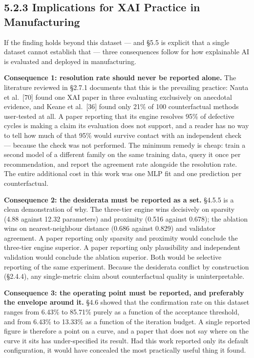\hypertarget{implications-for-xai-practice-in-manufacturing}{%
\subsection{5.2.3 Implications for XAI Practice in Manufacturing}\label{implications-for-xai-practice-in-manufacturing}}

If the finding holds beyond this dataset --- and §5.5 is explicit that a single dataset cannot establish that --- three consequences follow for how explainable AI is evaluated and deployed in manufacturing.

\textbf{Consequence 1: resolution rate should never be reported alone.} The literature reviewed in §2.7.1 documents that this is the prevailing practice: Nauta et al.~{[}70{]} found one XAI paper in three evaluating exclusively on anecdotal evidence, and Keane et al.~{[}36{]} found only 21\% of 100 counterfactual methods user-tested at all. A paper reporting that its engine resolves 95\% of defective cycles is making a claim its evaluation does not support, and a reader has no way to tell how much of that 95\% would survive contact with an independent check --- because the check was not performed. The minimum remedy is cheap: train a second model of a different family on the same training data, query it once per recommendation, and report the agreement rate alongside the resolution rate. The entire additional cost in this work was one MLP fit and one prediction per counterfactual.

\textbf{Consequence 2: the desiderata must be reported as a set.} §4.5.5 is a clean demonstration of why. The three-tier engine wins decisively on sparsity (4.88 against 12.32 parameters) and proximity (0.516 against 0.678); the ablation wins on nearest-neighbour distance (0.686 against 0.829) and validator agreement. A paper reporting only sparsity and proximity would conclude the three-tier engine superior. A paper reporting only plausibility and independent validation would conclude the ablation superior. Both would be selective reporting of the same experiment. Because the desiderata conflict by construction (§2.4.4), any single-metric claim about counterfactual quality is uninterpretable.

\textbf{Consequence 3: the operating point must be reported, and preferably the envelope around it.} §4.6 showed that the confirmation rate on this dataset ranges from 6.43\% to 85.71\% purely as a function of the acceptance threshold, and from 6.43\% to 13.33\% as a function of the iteration budget. A single reported figure is therefore a point on a curve, and a paper that does not say where on the curve it sits has under-specified its result. Had this work reported only its default configuration, it would have concealed the most practically useful thing it found.

